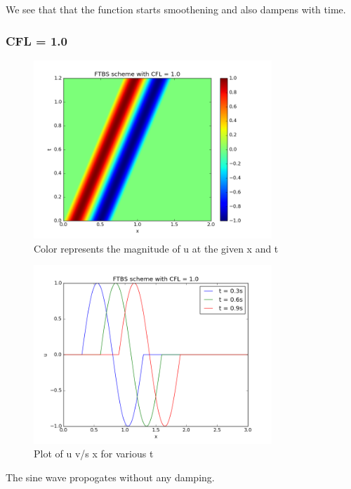 \documentclass[11pt, a4paper]{article}
\begin{document}
We see that that the function starts smoothening and also dampens with time.

\subsubsection{CFL = 1.0}
\begin{figure}[H]
 \centering
 \includegraphics[width = 0.8\textwidth]{FTBS2_1.png}
 \caption{Color represents the magnitude of u at the given x and t}
\end{figure}

\begin{figure}[H]
 \centering
 \includegraphics[width = 0.8\textwidth]{FTBS2_1_1.png}
 \caption{Plot of u v/s x for various t}
\end{figure}

The sine wave propogates without any damping.
\end{document}
